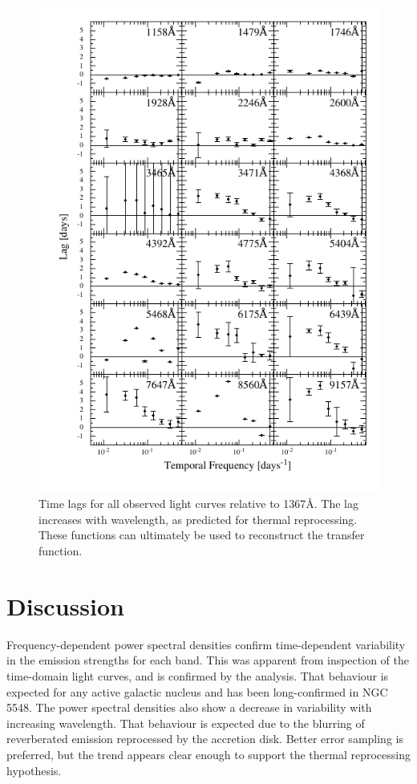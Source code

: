 \documentclass[11pt,letterpaper]{article}
\begin{document}
    \begin{figure}
        \centering
        \includegraphics[width=.9\textwidth]{../img/timelag_atlas.pdf}
        \caption{Time lags for all observed light curves relative to 1367\AA. The lag increases with wavelength, as predicted for thermal reprocessing. These functions can ultimately be used to reconstruct the transfer function.}
        \label{fig:timelag_atlas}
    \end{figure}

\section{Discussion}

Frequency-dependent power spectral densities confirm time-dependent variability in the emission strengths for each band. This was apparent from inspection of the time-domain light curves, and is confirmed by the analysis. That behaviour is expected for any active galactic nucleus and has been long-confirmed in NGC 5548. The power spectral densities also show a decrease in variability with increasing wavelength. That behaviour is expected due to the blurring of reverberated emission reprocessed by the accretion disk. Better error sampling is preferred, but the trend appears clear enough to support the thermal reprocessing hypothesis.
\end{document}
